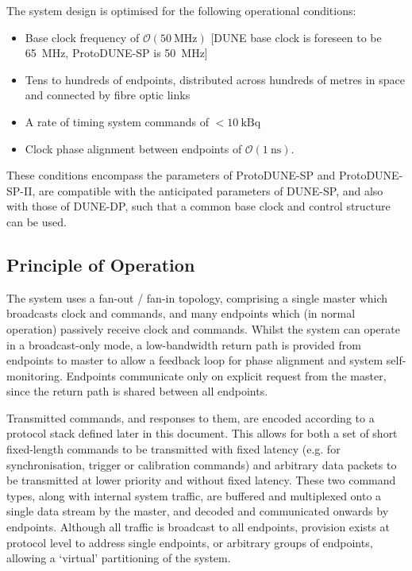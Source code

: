 \documentclass{dune}
\begin{document}
The system design is optimised for the following operational conditions:

\begin{itemize}
	\item Base clock frequency of $\mathcal{O}(\SI{50}{\mega\hertz})$ [DUNE base clock is foreseen to be \SI{65}{\mega\hertz}, ProtoDUNE-SP is \SI{50}{\mega\hertz}]
	\item Tens to hundreds of endpoints, distributed across hundreds of metres in space and connected by fibre optic links
	\item A rate of timing system commands of $<\SI{10}{\kilo\becquerel}$
	\item Clock phase alignment between endpoints of $\mathcal{O}(\SI{1}{\nano\second})$.
\end{itemize}

These conditions encompass the parameters of ProtoDUNE-SP and ProtoDUNE-SP-II, are compatible with the anticipated parameters of DUNE-SP, and also with those of DUNE-DP, such that a common base clock and control structure can be used.


\subsection{Principle of Operation}

The system uses a fan-out / fan-in topology, comprising a single master which broadcasts clock and commands, and many endpoints which (in normal operation) passively receive clock and commands. Whilst the system can operate in a broadcast-only mode, a low-bandwidth return path is provided from endpoints to master to allow a feedback loop for phase alignment and system self-monitoring. Endpoints communicate only on explicit request from the master, since the return path is shared between all endpoints.

Transmitted commands, and responses to them, are encoded according to a protocol stack defined later in this document. This allows for both a set of short fixed-length commands to be transmitted with fixed latency (e.g. for synchronisation, trigger or calibration commands) and arbitrary data packets to be transmitted at lower priority and without fixed latency. These two command types, along with internal system traffic, are buffered and multiplexed onto a single data stream by the master, and decoded and communicated onwards by endpoints. Although all traffic is broadcast to all endpoints, provision exists at protocol level to address single endpoints, or arbitrary groups of endpoints, allowing a `virtual' partitioning of the system.
\end{document}
